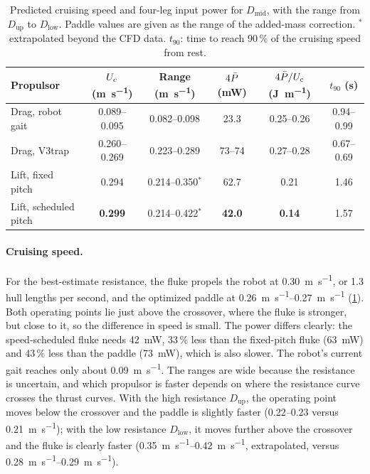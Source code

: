 \begin{table}[t]
  \centering
  \caption[Predicted cruising speed]{Predicted cruising speed and four-leg input power for $D_\text{mid}$, with the range
    from $D_\text{up}$ to $D_\text{low}$. Paddle values are given as the range of the added-mass correction. $^*$ extrapolated beyond
    the CFD data. $t_{90}$: time to reach 90\,\% of the cruising speed from rest.}
  \label{tab:selfprop}
  \small
  \begin{tabular}{@{}lccccc@{}}
    \toprule
    Propulsor & $U_c$ (\si{\metre\per\second}) & Range (\si{\metre\per\second}) & $4\bar{P}$ (mW) & $4\bar{P}/U_c$ (\si{\joule\per\metre}) & $t_{90}$ (s) \\
    \midrule
    Drag, robot gait & 0.089--0.095 & 0.082--0.098 & 23.3 & 0.25--0.26 & 0.94--0.99 \\
    Drag, V3trap & 0.260--0.269 & 0.223--0.289 & 73--74 & 0.27--0.28 & 0.67--0.69 \\
    Lift, fixed pitch & 0.294 & 0.214--0.350$^*$ & 62.7 & 0.21 & 1.46 \\
    Lift, scheduled pitch & \textbf{0.299} & 0.214--0.422$^*$ & \textbf{42.0} & \textbf{0.14} & 1.57 \\
    \bottomrule
  \end{tabular}
\end{table}

\paragraph{Cruising speed.} For the best-estimate resistance, the fluke propels the robot at \SI{0.30}{\metre\per\second}, or
1.3 hull lengths per second, and the optimized paddle at \SIrange{0.26}{0.27}{\metre\per\second} (\cref{tab:selfprop}). Both
operating points lie just above the crossover, where the fluke is stronger, but close to it, so the difference in speed is small.
The power differs clearly: the speed-scheduled fluke needs \SI{42}{\milli\watt}, 33\,\% less than the fixed-pitch fluke
(\SI{63}{\milli\watt}) and 43\,\% less than the paddle (\SI{73}{\milli\watt}), which is also slower. The robot's current gait reaches
only about \SI{0.09}{\metre\per\second}. The ranges are wide because the resistance is uncertain, and which propulsor is faster
depends on where the resistance curve crosses the thrust curves. With the high resistance $D_\text{up}$, the operating point
moves below the crossover and the paddle is slightly faster (\SIrange{0.22}{0.23}{} versus \SI{0.21}{\metre\per\second}); with the
low resistance $D_\text{low}$, it moves further above the crossover and the fluke is clearly faster
(\SIrange{0.35}{0.42}{\metre\per\second}, extrapolated, versus \SIrange{0.28}{0.29}{\metre\per\second}).

